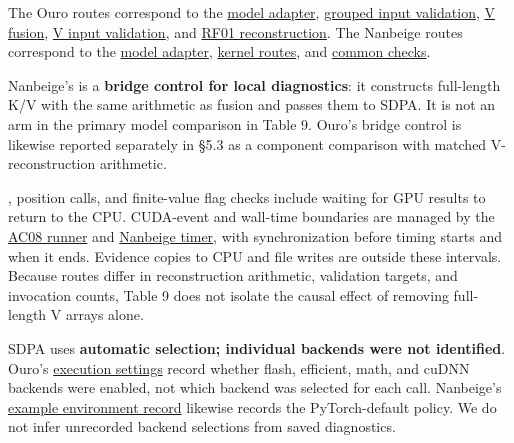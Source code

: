 \documentclass[10pt,a4paper]{article}
\begin{document}
The Ouro routes correspond to the \href{https://github.com/metaSATOKEN/nsn/blob/c37d39ea0106274d9f661cfbb268b0ed05319846/scripts/loop_kv_ac08_attention.py}{model adapter}, \href{https://github.com/metaSATOKEN/nsn/blob/c37d39ea0106274d9f661cfbb268b0ed05319846/scripts/loop_kv_iv01_kernel.py}{grouped input validation}, \href{https://github.com/metaSATOKEN/nsn/blob/c37d39ea0106274d9f661cfbb268b0ed05319846/scripts/loop_kv_vf01_kernel.py}{V fusion}, \href{https://github.com/metaSATOKEN/nsn/blob/c37d39ea0106274d9f661cfbb268b0ed05319846/scripts/loop_kv_vf01_checks.py}{V input validation}, and \href{https://github.com/metaSATOKEN/nsn/blob/c37d39ea0106274d9f661cfbb268b0ed05319846/scripts/loop_kv_rf01_kernel.py}{RF01 reconstruction}. The Nanbeige routes correspond to the \href{https://github.com/metaSATOKEN/nsn/blob/c37d39ea0106274d9f661cfbb268b0ed05319846/scripts/loop_kv_nb05_attention.py}{model adapter}, \href{https://github.com/metaSATOKEN/nsn/blob/c37d39ea0106274d9f661cfbb268b0ed05319846/scripts/loop_kv_nb05_kernel.py}{kernel routes}, and \href{https://github.com/metaSATOKEN/nsn/blob/c37d39ea0106274d9f661cfbb268b0ed05319846/scripts/loop_kv_nb05_checks.py}{common checks}.

Nanbeige's \texttt{} is a \textbf{bridge control for local diagnostics}: it constructs full-length K/V with the same arithmetic as fusion and passes them to SDPA. It is not an arm in the primary model comparison in Table 9. Ouro's bridge control is likewise reported separately in §5.3 as a component comparison with matched V-reconstruction arithmetic.

\texttt{}, position \texttt{} calls, and finite-value flag checks include waiting for GPU results to return to the CPU. CUDA-event and wall-time boundaries are managed by the \href{https://github.com/metaSATOKEN/nsn/blob/c37d39ea0106274d9f661cfbb268b0ed05319846/scripts/loop_kv_ac08.py}{AC08 runner} and \href{https://github.com/metaSATOKEN/nsn/blob/c37d39ea0106274d9f661cfbb268b0ed05319846/scripts/loop_kv_nb05_measure.py}{Nanbeige timer}, with synchronization before timing starts and when it ends. Evidence copies to CPU and file writes are outside these intervals. Because routes differ in reconstruction arithmetic, validation targets, and invocation counts, Table 9 does not isolate the causal effect of removing full-length V arrays alone.

SDPA uses \textbf{automatic selection; individual backends were not identified}. Ouro's \href{https://github.com/metaSATOKEN/nsn/blob/c37d39ea0106274d9f661cfbb268b0ed05319846/runs/loop-kv-ac08-20261002-095022-41c2554c/execution_settings.json}{execution settings} record whether flash, efficient, math, and cuDNN backends were enabled, not which backend was selected for each call. Nanbeige's \href{https://github.com/metaSATOKEN/nsn/blob/c37d39ea0106274d9f661cfbb268b0ed05319846/runs/loop-kv-nb05-20261003-090604-18baabf5/books/b0/environment.json}{example environment record} likewise records the PyTorch-default policy. We do not infer unrecorded backend selections from saved diagnostics.
\end{document}
